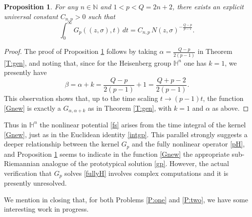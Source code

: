 \documentclass[11pt,a4paper]{amsart}
\newcommand{\Hn}{\mathbb H^n}
\numberwithin{equation}{section}
\newtheorem{proposition}[theorem]{Proposition}
\numberwithin{equation}{section}
\begin{document}
\begin{proposition}\label{P:Gp}
For any $n\in \mathbb N$ and $1<p<Q = 2n+2$, there exists an explicit universal constant $C_{n,p}>0$ such that
\[
\int_0^\infty G_p((z,\sigma),t)\, dt
   =  C_{n,p}\, N(z,\sigma)^{-\frac{Q-p}{p-1}}.
\]
\end{proposition}

\begin{proof}
The proof of Proposition \ref{P:Gp} follows by taking $\alpha = \frac{Q-p}{2(p-1)}$ in Theorem \ref{T:gen}, and noting that, since for the Heisenberg group $\Hn$ one has $k=1$, we presently have
\[
\beta = \alpha + k = \frac{Q-p}{2(p-1)} + 1 = \frac{Q+p-2}{2(p-1)}.
\]
This observation shows that, up to the time scaling $t\to (p-1)t$, the function \eqref{Gnew} is exactly a $G_{\alpha,\alpha+k}$ as in Theorem \ref{T:gen}, with $k=1$ and $\alpha$ as above.

\end{proof}
Thus in $\Hn$ the nonlinear potential \eqref{fs} arises from the time integral of the kernel \eqref{Gnew}, just as in the Euclidean identity \eqref{intgp}. This parallel strongly suggests a deeper relationship between the kernel $G_p$ and the fully nonlinear operator \eqref{pH}, and Proposition \ref{P:Gp} seems to indicate in the function \eqref{Gnew} the appropriate sub-Riemannian analogue of the prototypical solution \eqref{gp}. However, the actual verification that $G_p$ solves \eqref{fullyH} involves complex computations and it is presently unresolved. 


We mention in closing that, for both Problems \ref{P:one} and \ref{P:two}, we have some interesting work in progress.




\end{document}

